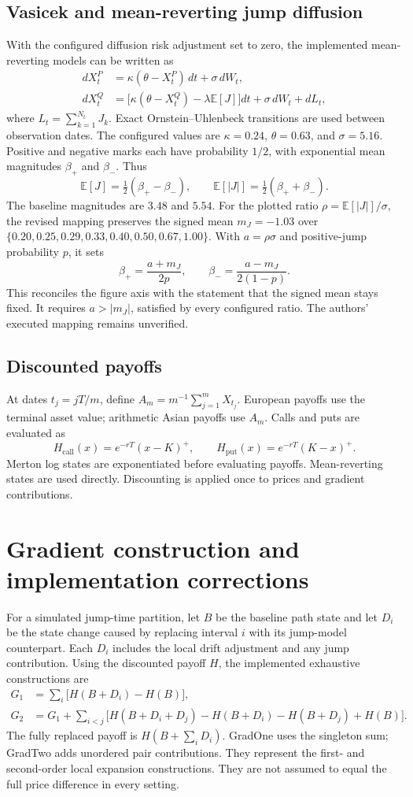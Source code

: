 \documentclass[11pt,a4paper]{article}
\newcommand{\E}{\mathbb{E}}
\begin{document}
\subsection{Vasicek and mean-reverting jump diffusion}
With the configured diffusion risk adjustment set to zero, the
implemented mean-reverting models can be written as
\begin{align}
dX_t^{P}&=\kappa(\theta-X_t^{P})\,dt+\sigma\,dW_t,\\
dX_t^{Q}&=\bigl[\kappa(\theta-X_t^{Q})-\lambda\E[J]\bigr]dt
             +\sigma\,dW_t+dL_t,
\end{align}
where $L_t=\sum_{k=1}^{N_t}J_k$. Exact Ornstein--Uhlenbeck transitions
are used between observation dates. The configured values are
$\kappa=0.24$, $\theta=0.63$, and $\sigma=5.16$.
Positive and negative marks each have probability $1/2$, with exponential
mean magnitudes $\beta_+$ and $\beta_-$. Thus
\[
\E[J]=\tfrac12(\beta_+-\beta_-),\qquad
\E[|J|]=\tfrac12(\beta_++\beta_-).
\]
The baseline magnitudes are $3.48$ and $5.54$. For the plotted ratio
$\rho=\E[|J|]/\sigma$, the revised mapping preserves the signed mean $m_J=-1.03$ over
$\{0.20,0.25,0.29,0.33,0.40,0.50,0.67,1.00\}$.
With $a=\rho\sigma$ and positive-jump probability $p$, it sets
\[
\beta_+=\frac{a+m_J}{2p},\qquad
\beta_-=\frac{a-m_J}{2(1-p)}.
\]
This reconciles the figure axis with the statement that the signed mean
stays fixed. It requires $a>|m_J|$, satisfied by every configured ratio.
The authors' executed mapping remains unverified.

\subsection{Discounted payoffs}
At dates $t_j=jT/m$, define $A_m=m^{-1}\sum_{j=1}^m X_{t_j}$.
European payoffs use the terminal asset value; arithmetic Asian payoffs
use $A_m$. Calls and puts are evaluated as
\[
H_{\mathrm{call}}(x)=e^{-rT}(x-K)^+,
\qquad H_{\mathrm{put}}(x)=e^{-rT}(K-x)^+.
\]
Merton log states are exponentiated before evaluating payoffs.
Mean-reverting states are used directly. Discounting is applied once to
prices and gradient contributions.

\newpage
\section{Gradient construction and implementation corrections}
For a simulated jump-time partition, let $B$ be the baseline path state
and let $D_i$ be the state change caused by replacing interval $i$ with
its jump-model counterpart. Each $D_i$ includes the local drift
adjustment and any jump contribution. Using the discounted payoff $H$,
the implemented exhaustive constructions are
\begin{align}
G_1&=\sum_i\bigl[H(B+D_i)-H(B)\bigr],\\
G_2&=G_1+\sum_{i<j}\bigl[H(B+D_i+D_j)
             -H(B+D_i)-H(B+D_j)+H(B)\bigr].
\end{align}
The fully replaced payoff is $H(B+\sum_iD_i)$. GradOne uses the singleton
sum; GradTwo adds unordered pair contributions. They represent the
first- and second-order local expansion constructions. They are not
assumed to equal the full price difference in every setting.
\end{document}
